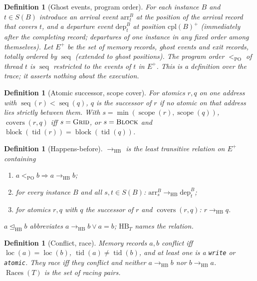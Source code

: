 \documentclass[11pt]{article}
\newtheorem{definition}[theorem]{Definition}
\theoremstyle{remark}
\DeclareMathOperator{\tid}{tid}
\DeclareMathOperator{\seq}{seq}
\DeclareMathOperator{\loc}{loc}
\DeclareMathOperator{\blk}{block}
\DeclareMathOperator{\scope}{scope}
\DeclareMathOperator{\Races}{Races}
\DeclareMathOperator{\covers}{covers}
\newcommand{\HB}{\to_{\mathrm{HB}}}
\newcommand{\HBr}{\trianglelefteq_{\mathrm{HB}}}
\newcommand{\PO}{<_{\mathrm{PO}}}
\newcommand{\arr}[2]{\mathrm{arr}^{#2}_{#1}}
\newcommand{\dep}[2]{\mathrm{dep}^{#2}_{#1}}
\newcommand{\Eplus}{E^{+}}
\begin{document}
\begin{definition}[Ghost events, program order]\label{def:ghost}
For each instance $B$ and $t\in S(B)$ introduce an \emph{arrival event}
$\arr{t}{B}$ at the position of the arrival record that covers $t$, and a
\emph{departure event} $\dep{t}{B}$ at position $\mathrm{cpl}(B)^{+}$
(immediately after the completing record; departures of one instance in any
fixed order among themselves). Let $\Eplus$ be the set of memory records,
ghost events and exit records, totally ordered by $\seq$ (extended to ghost
positions). The \emph{program order} $\PO$ of thread $t$ is $\seq$ restricted
to the events of $t$ in $\Eplus$. This is a definition over the trace; it
asserts nothing about the execution.
\end{definition}

\begin{definition}[Atomic successor, scope cover]
For atomics $r,q$ on one address with $\seq(r)<\seq(q)$, $q$ is the
\emph{successor} of $r$ if no atomic on that address lies strictly between
them. With $s=\min(\scope(r),\scope(q))$, $\covers(r,q)$ iff
$s=\textsc{Grid}$, or $s=\textsc{Block}$ and $\blk(\tid(r))=\blk(\tid(q))$.
\end{definition}

\begin{definition}[Happens-before]\label{def:hb}
$\HB$ is the least transitive relation on $\Eplus$ containing
\begin{enumerate}
\item[\textbf{(PO)}] $a\PO b\Rightarrow a\HB b$;
\item[\textbf{(SYNC)}] for every instance $B$ and all $s,t\in S(B)$:
      $\arr{s}{B}\HB\dep{t}{B}$;
\item[\textbf{(ATOM)}] for atomics $r,q$ with $q$ the successor of $r$ and
      $\covers(r,q)$: $r\HB q$.
\end{enumerate}
$a\HBr b$ abbreviates $a\HB b\vee a=b$; $\mathrm{HB}_T$ names the relation.
\end{definition}

\begin{definition}[Conflict, race]\label{def:race}
Memory records $a,b$ \emph{conflict} iff $\loc(a)=\loc(b)$,
$\tid(a)\ne\tid(b)$, and at least one is a \texttt{write} or \texttt{atomic}.
They \emph{race} iff they conflict and neither $a\HB b$ nor $b\HB a$.
$\Races(T)$ is the set of racing pairs.
\end{definition}
\end{document}
